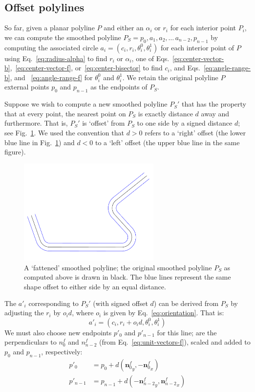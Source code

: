 \documentclass{article}
\begin{document}
\subsection{Offset polylines}
\label{sec:offset-polylines}
%
So far, given a planar polyline $P$ and either an $\alpha_i$ or $r_i$ for each interior point $P_i$, we can compute the smoothed polyline $P_S = p_0, a_1, a_2,\ldots\,a_{n-2}, p_{n-1}$ by computing the associated circle $a_i=\left(c_i, r_i, \theta^0_i, \theta^1_i\right)$ for each interior point of $P$ using Eq.~\eqref{eq:radius-alpha} to find $r_i$ or $\alpha_i$, one of Eqs.~\eqref{eq:center-vector-b},~\eqref{eq:center-vector-f}, or~\eqref{eq:center-bisector} to find $c_i$, and Eqs.~\eqref{eq:angle-range-b}, and ~\eqref{eq:angle-range-f} for $\theta^0_i$ and $\theta^1_i$.  We retain the original polyline $P$ external points $p_0$ and $p_{n-1}$ as the endpoints of $P_S$.

Suppose we wish to compute a new smoothed polyline $P_S'$ that has the property that at every point, the nearest point on $P_S$ is exactly distance $d$ away and furthermore.  That is, $P_S'$ is `offset' from $P_S$ to one side by a signed distance $d$; see Fig.~\ref{fig:fattened-polyline}.  We used the convention that $d>0$ refers to a `right' offset (the lower blue line in Fig.~\ref{fig:fattened-polyline}) and $d<0$ to a `left' offset (the upper blue line in the same figure).
%
\begin{figure}[h]
  \centering
  \includegraphics[width=7cm]{5}
  \caption{A `fattened' smoothed polyline; the original smoothed polyline $P_S$ as computed above is drawn in black.  The blue lines represent the same shape offset to either side by an equal distance.}
  \label{fig:fattened-polyline}
\end{figure}
%
The $a'_i$ corresponding to $P_S'$ (with signed offset $d$) can be derived from $P_S$ by adjusting the $r_i$ by $o_id$, where $o_i$ is given by Eq.~\eqref{eq:orientation}.  That is:
%
\begin{equation}
  \label{eq:arc-offset}
  a'_i = \left(c_i, r_i + o_id, \theta^0_i, \theta^1_i\right)
\end{equation}
%
We must also choose new endpoints $p'_0$ and $p'_{n-1}$ for this line;  are the perpendiculars to $n^f_0$ and $n^f_{n-2}$ (from Eq.~\eqref{eq:unit-vectors-f}), scaled and added to $p_0$ and $p_{n-1}$, respectively:
%
\begin{align}
  \label{eq:endpoints-prime}
  p'_0 &= p_0 + d \left({\mathbf{n}^f_0}_y, -{\mathbf{n}^f_0}_x\right)\\
  p'_{n-1} &= p_{n-1} + d \left(-{\mathbf{n}^f_{n-2}}_y, {\mathbf{n}^f_{n-2}}_x\right)
\end{align}
%
\end{document}
